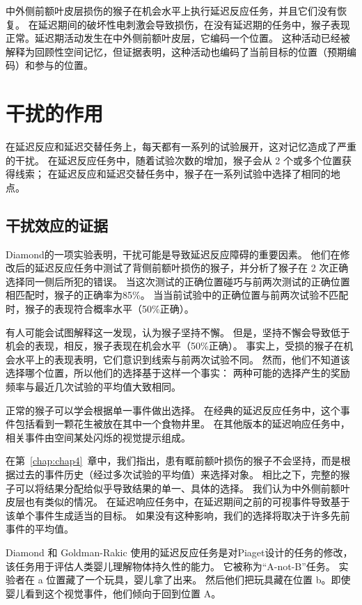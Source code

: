 中外侧前额叶皮层损伤的猴子在机会水平上执行延迟反应任务，并且它们没有恢复。
在延迟期间的破坏性电刺激会导致损伤，在没有延迟期的任务中，猴子表现正常。延迟期活动发生在中外侧前额叶皮层，它编码一个位置。
这种活动已经被解释为回顾性空间记忆，但证据表明，这种活动也编码了当前目标的位置（预期编码）和参与的位置。



\section{干扰的作用}

在延迟反应和延迟交替任务上，每天都有一系列的试验展开，这对记忆造成了严重的干扰。
在延迟反应任务中，随着试验次数的增加，猴子会从 2 个或多个位置获得线索；
在延迟反应和延迟交替任务中，猴子在一系列试验中选择了相同的地点。



\subsection{干扰效应的证据}

Diamond\cite{diamond1989comparison}的一项实验表明，干扰可能是导致延迟反应障碍的重要因素。
他们在修改后的延迟反应任务中测试了背侧前额叶损伤的猴子，并分析了猴子在 2 次正确选择同一侧后所犯的错误。
当这次测试的正确位置碰巧与前两次测试的正确位置相匹配时，猴子的正确率为85\%。
当当前试验中的正确位置与前两次试验不匹配时，猴子的表现符合概率水平（50\%正确）。


有人可能会试图解释这一发现，认为猴子坚持不懈。
但是，坚持不懈会导致低于机会的表现，相反，猴子表现在机会水平（50\%正确）。
事实上，受损的猴子在机会水平上的表现表明，它们意识到线索与前两次试验不同。
然而，他们不知道该选择哪个位置，所以他们的选择基于这样一个事实：
两种可能的选择产生的奖励频率与最近几次试验的平均值大致相同。


正常的猴子可以学会根据单一事件做出选择。
在经典的延迟反应任务中，这个事件包括看到一颗花生被放在其中一个食物井里。
在其他版本的延迟响应任务中，相关事件由空间某处闪烁的视觉提示组成。


在第~\ref{chap:chap4}~章中，我们指出，患有眶前额叶损伤的猴子不会坚持，而是根据过去的事件历史（经过多次试验的平均值）来选择对象。
相比之下，完整的猴子可以将结果分配给似乎导致结果的单一、具体的选择。
我们认为中外侧前额叶皮层也有类似的情况。
在延迟响应任务中，在延迟期间之前的可视事件导致基于该单个事件生成适当的目标。
如果没有这种影响，我们的选择将取决于许多先前事件的平均值。


Diamond 和 Goldman-Rakic 使用的延迟反应任务是对Piaget\cite{piaget1955construction}设计的任务的修改，该任务用于评估人类婴儿理解物体持久性的能力。
它被称为“A-not-B”任务。
实验者在 a 位置藏了一个玩具，婴儿拿了出来。
然后他们把玩具藏在位置 b。即使婴儿看到这个视觉事件，他们倾向于回到位置 A\cite{harris1989object}。


